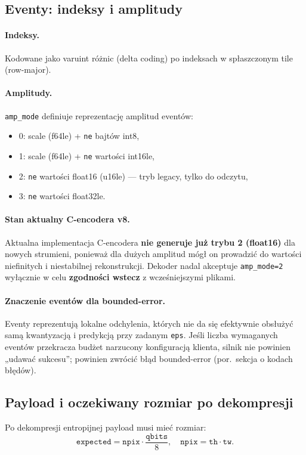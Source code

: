 \documentclass[11pt,a4paper]{article}
\begin{document}
\subsection{Eventy: indeksy i amplitudy}
\paragraph{Indeksy.}
Kodowane jako varuint różnic (delta coding) po indeksach w spłaszczonym tile (row-major).

\paragraph{Amplitudy.}
\texttt{amp\_mode} definiuje reprezentację amplitud eventów:
\begin{itemize}
  \item 0: scale (f64le) + \texttt{ne} bajtów int8,
  \item 1: scale (f64le) + \texttt{ne} wartości int16le,
  \item 2: \texttt{ne} wartości float16 (u16le) --- tryb legacy, tylko do odczytu,
  \item 3: \texttt{ne} wartości float32le.
\end{itemize}

\paragraph{Stan aktualny C-encodera v8.}
Aktualna implementacja C-encodera \textbf{nie generuje już trybu 2 (float16)} dla nowych strumieni, ponieważ dla dużych amplitud mógł on prowadzić do wartości niefinitych i niestabilnej rekonstrukcji. Dekoder nadal akceptuje \texttt{amp\_mode=2} wyłącznie w celu \textbf{zgodności wstecz} z wcześniejszymi plikami.

\paragraph{Znaczenie eventów dla bounded-error.}
Eventy reprezentują lokalne odchylenia, których nie da się efektywnie obsłużyć samą kwantyzacją i predykcją przy zadanym \texttt{eps}. Jeśli liczba wymaganych eventów przekracza budżet narzucony konfiguracją klienta, silnik nie powinien „udawać sukcesu”; powinien zwrócić błąd bounded-error (por.\ sekcja o kodach błędów).

\subsection{Payload i oczekiwany rozmiar po dekompresji}
Po dekompresji entropijnej payload musi mieć rozmiar:
\[
  \texttt{expected} = \texttt{npix}\cdot \frac{\texttt{qbits}}{8},
  \quad \texttt{npix}=\texttt{th}\cdot\texttt{tw}.
\]
\end{document}
